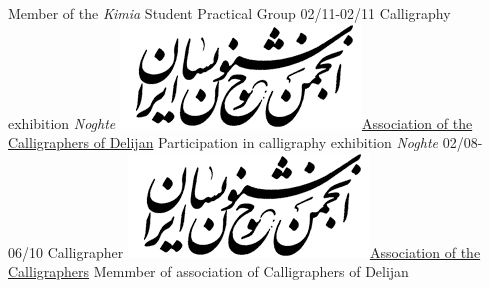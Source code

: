 \documentclass[a4paper]{friggeri-cv}
\begin{document}
\begin{entrylist}
        {Member of the \emph{Kimia} Student Practical Group}
        \entry
        {02/11-02/11}
        {    Calligraphy exhibition \emph{Noghte}}
        {\href{http://calligraphers.ir/}{\includegraphics[scale=0.15]{../assets/images/Khoshnevisan_logo.png}Association of the Calligraphers of Delijan}}
        {Participation in calligraphy exhibition \emph{Noghte}}
        \entry
        {02/08-06/10}
        {   Calligrapher}
        {\href{http://calligraphers.ir/}{\includegraphics[scale=0.15]{../assets/images/Khoshnevisan_logo.png}Association of the Calligraphers}}
        {Memmber of association of Calligraphers of Delijan}
    \end{entrylist}
    \\
\end{document}
